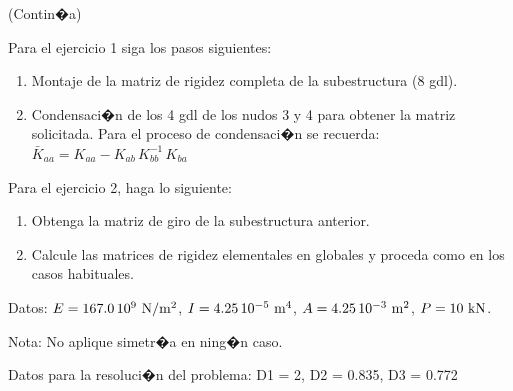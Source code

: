 \documentclass[a4paper,oneside,11pt]{article}
\newcommand{\nombre}{
\noindent\framebox{\parbox{\textwidth}{
\begin{tabular}{ll}
\bf APELLIDOS:\hspace{70mm} & \bf NOMBRE\\*[3mm]
\bf DNI:    & \bf FIRMA:
\end{tabular}}}\bigskip\bigskip}
\newcommand{\problema}[3]{\noindent\textbf{\large\uppercase {#1}}\hfill \large
Tiempo: $#2^{\rm h}\ #3^{\rm
m}$.\bigskip\bigskip}
\begin{document}
(Contin�a)

\newpage

Para el ejercicio 1 siga los pasos siguientes:
\begin{enumerate}
	\item Montaje de la matriz de rigidez completa de la subestructura (8 gdl).
	\item Condensaci�n de los 4 gdl de los nudos 3 y 4 para obtener la matriz solicitada. Para el proceso de condensaci�n se recuerda:
	$\bar{K}_{aa}=K_{aa}-K_{ab} \, K^{-1}_{bb} \, K_{ba}$
\end {enumerate}

Para el ejercicio 2, haga lo siguiente:
\begin{enumerate}
	\item Obtenga la matriz de giro de la subestructura anterior.
	\item Calcule las matrices de rigidez elementales en globales y proceda como en los casos habituales.
\end {enumerate}

Datos: $E=167.0\,10^{9} {\rm\ N/m^2}$, $I=4.25\,10^{-5} {\rm\ m^4}$, $A=4.25\,10^{-3} {\rm\ m^2}$, $P=10 {\rm\ kN}$.

Nota: No aplique simetr�a en ning�n caso.

Datos para la resoluci�n del problema: D1 = 2, D2 = 0.835, D3 = 0.772






\end{document}
